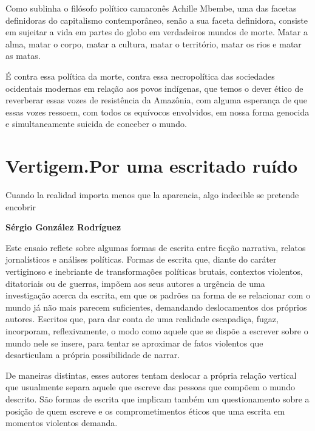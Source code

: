 Como sublinha o filósofo político camaronês Achille Mbembe, uma das
facetas definidoras do capitalismo contemporâneo, senão a sua faceta
definidora, consiste em sujeitar a vida em partes do globo em
verdadeiros mundos de morte. Matar a alma, matar o corpo, matar a
cultura, matar o território, matar os rios e matar as matas.

É contra
essa política da morte, contra essa necropolítica das sociedades
ocidentais modernas em relação aos povos indígenas, que temos o dever
ético de reverberar essas vozes de resistência da Amazônia, com alguma esperança de que essas vozes
ressoem, com todos os equívocos envolvidos, em nossa forma genocida e
simultaneamente suicida de conceber o mundo.

\chapter*{Vertigem.\vspace*{-.15cm}\break Por uma escrita\vspace*{-.15cm}\break do ruído}

\epigraph{\Formular\scriptsize{Cuando la realidad importa menos que la aparencia, algo indecible
se pretende encobrir}}{\Formular\scriptsize\textbf{Sérgio González Rodríguez}}

\noindent{}Este ensaio reflete sobre algumas formas de escrita entre ficção
narrativa, relatos jornalísticos e análises políticas. Formas de escrita
que, diante do caráter vertiginoso e inebriante de transformações
políticas brutais, contextos violentos, ditatoriais ou de guerras, impõem
aos seus autores a urgência de uma investigação acerca da escrita, em
que os padrões na forma de se relacionar com o mundo já não mais parecem
suficientes, demandando deslocamentos dos próprios autores. Escritos que,
para dar conta de uma realidade escapadiça, fugaz, incorporam,
reflexivamente, o modo como aquele que se dispõe a escrever sobre o
mundo nele se insere, para tentar se aproximar de fatos violentos que
desarticulam a própria possibilidade de narrar.

De maneiras distintas,
esses autores tentam deslocar a própria relação vertical que usualmente
separa aquele que escreve das pessoas que compõem o mundo descrito. São formas de escrita que implicam também um questionamento sobre a posição de quem escreve e os comprometimentos éticos que uma escrita em momentos violentos demanda.

